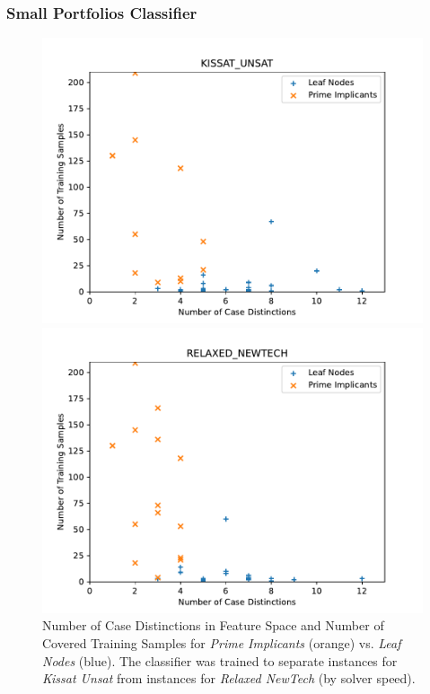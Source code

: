 \documentclass[a4paper, USenglish, cleveref, autoref, thm-restate]{lipics-v2021}
\theoremstyle{definition}
\begin{document}
\subsubsection{Small Portfolios Classifier} 

\begin{figure}
\begin{minipage}{.49\linewidth}
\includegraphics[width=\linewidth]{fig/kissat_unsat_leafs22_imps13.pdf}
\end{minipage}
\begin{minipage}{.49\linewidth}
\includegraphics[width=\linewidth]{fig/relaxed_newtech_leafs20_imps15.pdf}
\end{minipage}
\caption{Number of Case Distinctions in Feature Space and Number of Covered Training Samples for \emph{Prime Implicants} (orange) vs. \emph{Leaf Nodes} (blue). The classifier was trained to separate instances for \emph{Kissat Unsat} from instances for \emph{Relaxed NewTech} (by solver speed).}
\label{fig:eval:portfolio}
\end{figure}
\end{document}
